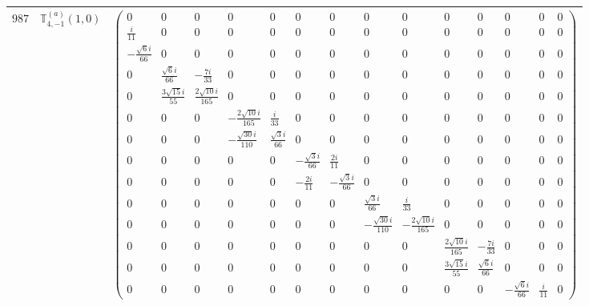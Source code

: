 \documentclass[fleqn,8pt,landscape]{jsarticle}
\begin{document}
\begin{center}
\begin{longtable}{ccc}
$ 987 $ & $ \mathbb{T}_{4,-1}^{(a)}(1,0) $ & $ \begin{pmatrix} 0 & 0 & 0 & 0 & 0 & 0 & 0 & 0 & 0 & 0 & 0 & 0 & 0 & 0 \\ \frac{i}{11} & 0 & 0 & 0 & 0 & 0 & 0 & 0 & 0 & 0 & 0 & 0 & 0 & 0 \\ - \frac{\sqrt{6} i}{66} & 0 & 0 & 0 & 0 & 0 & 0 & 0 & 0 & 0 & 0 & 0 & 0 & 0 \\ 0 & \frac{\sqrt{6} i}{66} & - \frac{7 i}{33} & 0 & 0 & 0 & 0 & 0 & 0 & 0 & 0 & 0 & 0 & 0 \\ 0 & \frac{3 \sqrt{15} i}{55} & \frac{2 \sqrt{10} i}{165} & 0 & 0 & 0 & 0 & 0 & 0 & 0 & 0 & 0 & 0 & 0 \\ 0 & 0 & 0 & - \frac{2 \sqrt{10} i}{165} & \frac{i}{33} & 0 & 0 & 0 & 0 & 0 & 0 & 0 & 0 & 0 \\ 0 & 0 & 0 & - \frac{\sqrt{30} i}{110} & \frac{\sqrt{3} i}{66} & 0 & 0 & 0 & 0 & 0 & 0 & 0 & 0 & 0 \\ 0 & 0 & 0 & 0 & 0 & - \frac{\sqrt{3} i}{66} & \frac{2 i}{11} & 0 & 0 & 0 & 0 & 0 & 0 & 0 \\ 0 & 0 & 0 & 0 & 0 & - \frac{2 i}{11} & - \frac{\sqrt{3} i}{66} & 0 & 0 & 0 & 0 & 0 & 0 & 0 \\ 0 & 0 & 0 & 0 & 0 & 0 & 0 & \frac{\sqrt{3} i}{66} & \frac{i}{33} & 0 & 0 & 0 & 0 & 0 \\ 0 & 0 & 0 & 0 & 0 & 0 & 0 & - \frac{\sqrt{30} i}{110} & - \frac{2 \sqrt{10} i}{165} & 0 & 0 & 0 & 0 & 0 \\ 0 & 0 & 0 & 0 & 0 & 0 & 0 & 0 & 0 & \frac{2 \sqrt{10} i}{165} & - \frac{7 i}{33} & 0 & 0 & 0 \\ 0 & 0 & 0 & 0 & 0 & 0 & 0 & 0 & 0 & \frac{3 \sqrt{15} i}{55} & \frac{\sqrt{6} i}{66} & 0 & 0 & 0 \\ 0 & 0 & 0 & 0 & 0 & 0 & 0 & 0 & 0 & 0 & 0 & - \frac{\sqrt{6} i}{66} & \frac{i}{11} & 0 \end{pmatrix} $ \\ \hline

\end{longtable}
\end{center}
\end{document}
